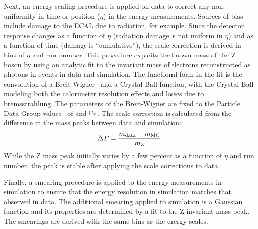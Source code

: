 Next, an energy scaling procedure is applied on data to correct any non-uniformity in time or position ($\eta$) in the energy measurements.
Sources of bias include damage to the ECAL due to radiation, for example.
Since the detector response changes as a function of $\eta$ (radiation damage is not uniform in $\eta$) and as a function of time (damage is ``cumulative''), the scale correction is derived in bins of $\eta$ and run number.
This procedure exploits the known mass of the Z boson by using an analytic fit to the invariant mass of electrons reconstructed as photons in \Zee events in data and simulation.
The functional form in the fit is the convolution of a Breit-Wigner~\cite{Breit:1936zzb} and a Crystal Ball function, with the Crystal Ball modeling both the calorimeter resolution effects and losses due to bremsstrahlung.
The parameters of the Breit-Wigner are fixed to the Particle Data Group values~\cite{Tanabashi:2018oca} of \mZ and $\Gamma_{\mathrm{Z}}$.
The scale correction is calculated from the difference in the mass peaks between data and simulation:
\begin{equation}
    \Delta P = \frac{m_{\text{data}} - m_{\text{MC}}}{m_{\mathrm{Z}}}
\end{equation}
While the Z mass peak initially varies by a few percent as a function of $\eta$ and run number, the peak is stable after applying the scale corrections to data. %

Finally, a smearing procedure is applied to the energy measurements in simulation to ensure that the energy resolution in simulation matches that observed in data.
The additional smearing applied to simulation is a Gaussian function and its properties are determined by a fit to the Z invariant mass peak.
The smearings are derived with the same bins as the energy scales.

